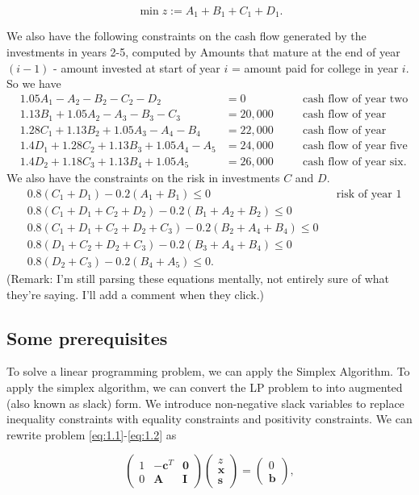 \documentclass[12pt,english]{article}
\begin{document}
$$
\min z := A_1 + B_1 + C_1 + D_1.
$$

We also have the following constraints on the cash flow generated by the investments in years 2-5, computed by Amounts that mature at the end of year $(i-1)$ - amount invested at start of year $i$ = amount paid for college in year $i$. So we have
$$
\begin{aligned}
&1.05A_1 - A_2 - B_2 - C_2 - D_2 			&= 0 	\quad 	&& \text{cash flow of year two} \\
&1.13B_1 +1.05A_2 - A_3 - B_3 - C_3 		&= 20,000 \quad 	&& \text{cash flow of year three}\\
&1.28C_1 + 1.13B_2 + 1.05A_3 - A_4 - B_4 	&= 22,000	 \quad	&& \text{cash flow of year four} \\
&1.4D_1 + 1.28C_2 + 1.13B_3 + 1.05A_4 -A_5 &=24,000  \quad	&& \text{cash flow of year five}\\
&1.4D_2 + 1.18C_3 + 1.13B_4 + 1.05 A_5	&= 26,000	  \quad	&& \text{cash flow of year six}.
\end{aligned}
$$
We also have the constraints on the risk in investments $C$ and $D$.
$$
\begin{aligned}
& 0.8(C_1 + D_1) - 0.2(A_1+B_1) \leq 0 	&& \text{risk of year 1} 	\\
& 0.8(C_1 + D_1 + C_2 + D_2) - 0.2 (B_1 + A_2 + B_2) \leq 0	\\
& 0.8(C_1 + D_1 + C_2 + D_2 + C_3) - 0.2(B_2 + A_4 +B_4) \leq 0 \\
& 0.8(D_1 + C_2 + D_2 + C_3) - 0.2(B_3 + A_4 + B_4) \leq 0 \\
& 0.8(D_2 + C_3) - 0.2(B_4 + A_5) \leq 0.
\end{aligned}
$$
(Remark: I'm still parsing these equations mentally, not entirely sure of what they're saying. I'll add a comment when they click.)

\subsection{Some prerequisites}

To solve a linear programming problem, we can apply the Simplex Algorithm.   To apply the simplex algorithm, we can convert the LP problem to into augmented (also known as slack) form.  We introduce non-negative slack variables to replace inequality constraints with equality constraints and positivity constraints.   We can rewrite problem \eqref{eq:1.1}-\eqref{eq:1.2} as

\begin{equation}\label{eq:2.1}
\left(
\begin{array}{ccc}
1	&	-\mathbf{c}^T 	&	\mathbf{0} 	\\
0	&	\mathbf{A}		& 	\mathbf{I}
\end{array}
\right)
\left(
\begin{array}{c}
z \\
\mathbf{x} \\
\mathbf{s}
\end{array}
\right)
= 
\left(
\begin{array}{c}
0 \\
\mathbf{b}
\end{array}
\right),
\end{equation}
\end{document}
